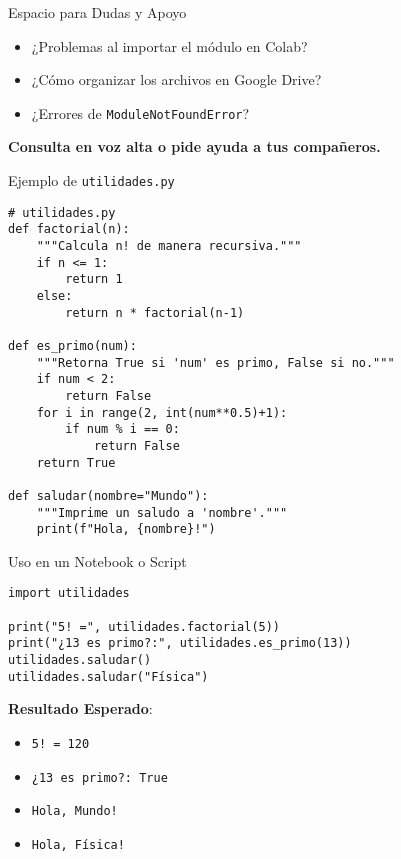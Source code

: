 \documentclass[10pt]{beamer}
\begin{document}
\begin{frame}{Espacio para Dudas y Apoyo}
  \begin{itemize}
    \item ¿Problemas al importar el módulo en Colab?
    \item ¿Cómo organizar los archivos en Google Drive?
    \item ¿Errores de \texttt{ModuleNotFoundError}?
  \end{itemize}
  \vspace{0.2cm}
  \textbf{Consulta en voz alta o pide ayuda a tus compañeros.}
\end{frame}

\begin{frame}[fragile]{Ejemplo de \texttt{utilidades.py}}
\begin{verbatim}
# utilidades.py
def factorial(n):
    """Calcula n! de manera recursiva."""
    if n <= 1:
        return 1
    else:
        return n * factorial(n-1)

def es_primo(num):
    """Retorna True si 'num' es primo, False si no."""
    if num < 2:
        return False
    for i in range(2, int(num**0.5)+1):
        if num % i == 0:
            return False
    return True

def saludar(nombre="Mundo"):
    """Imprime un saludo a 'nombre'."""
    print(f"Hola, {nombre}!")
\end{verbatim}
\end{frame}

\begin{frame}[fragile]{Uso en un Notebook o Script}
\begin{verbatim}
import utilidades

print("5! =", utilidades.factorial(5))
print("¿13 es primo?:", utilidades.es_primo(13))
utilidades.saludar()
utilidades.saludar("Física")
\end{verbatim}

\textbf{Resultado Esperado}:
\begin{itemize}
  \item \texttt{5! = 120}
  \item \texttt{¿13 es primo?: True}
  \item \texttt{Hola, Mundo!}
  \item \texttt{Hola, Física!}
\end{itemize}
\end{frame}
\end{document}
